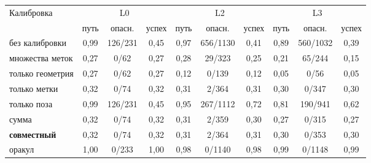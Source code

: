 \begin{tabular}{lccccccccc}
\toprule
Калибровка & \multicolumn{3}{c}{L0} & \multicolumn{3}{c}{L2} & \multicolumn{3}{c}{L3} \\
 & путь & опасн. & успех & путь & опасн. & успех & путь & опасн. & успех \\
\midrule
без калибровки & 0{,}99 & 126/231 & 0{,}45 & 0{,}97 & 656/1130 & 0{,}41 & 0{,}89 & 560/1032 & 0{,}39 \\
множества меток & 0{,}27 & 0/62 & 0{,}27 & 0{,}28 & 29/323 & 0{,}25 & 0{,}21 & 65/244 & 0{,}15 \\
только геометрия & 0{,}27 & 0/62 & 0{,}27 & 0{,}12 & 0/139 & 0{,}12 & 0{,}05 & 0/56 & 0{,}05 \\
только метки & 0{,}32 & 0/74 & 0{,}32 & 0{,}31 & 2/364 & 0{,}31 & 0{,}30 & 0/347 & 0{,}30 \\
только поза & 0{,}99 & 126/231 & 0{,}45 & 0{,}95 & 267/1112 & 0{,}72 & 0{,}81 & 190/941 & 0{,}62 \\
сумма & 0{,}32 & 0/74 & 0{,}32 & 0{,}31 & 2/359 & 0{,}30 & 0{,}27 & 0/315 & 0{,}27 \\
\textbf{совместный} & 0{,}32 & 0/74 & 0{,}32 & 0{,}31 & 2/364 & 0{,}31 & 0{,}30 & 0/353 & 0{,}30 \\
оракул & 1{,}00 & 0/233 & 1{,}00 & 0{,}98 & 0/1140 & 0{,}98 & 0{,}99 & 0/1148 & 0{,}99 \\
\bottomrule
\end{tabular}
